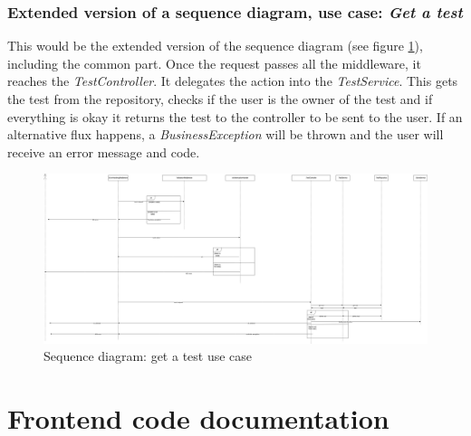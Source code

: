         \subsubsection{Extended version of a sequence diagram, use case: \textit{Get a test}}
            This would be the extended version of the sequence diagram (see figure \ref{fig:implementation_getatest}), including the common part. 
            Once the request passes all the middleware, it reaches the \textit{TestController}. 
            It delegates the action into the \textit{TestService}. This gets the test from the repository, 
            checks if the user is the owner of the test and if everything is okay it returns the test to the controller to be sent to the user.
            If an alternative flux happens, a \textit{BusinessException} will be thrown and the user will receive an error message and code.
                \newpage
                \begin{figure}[H]
                    \centering
                        \includegraphics[angle=90, width=\textwidth, height=\textheight]{assets/diagrams/getatest.png}
                    \caption{Sequence diagram: get a test use case}
                    \label{fig:implementation_getatest}
                \end{figure}

\newpage
\section{Frontend code documentation}
